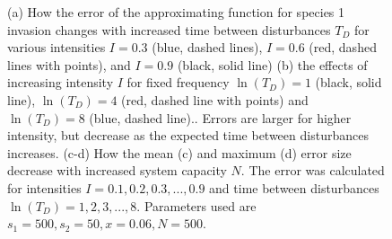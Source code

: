 \begin{figure}[th]
   \caption[Approximation errors for species 1 invasion]{(a) How the error of the approximating function for species 1 invasion changes with increased time between disturbances $T_D$ for various intensities $I=0.3$ (blue, dashed lines), $I=0.6$ (red, dashed lines with points), and $I=0.9$ (black, solid line) (b) the effects of increasing intensity $I$ for fixed frequency $\ln(T_D)=1$ (black, solid line), $\ln(T_D)=4$ (red, dashed line with points) and $\ln(T_D)=8$ (blue, dashed line).. Errors are larger for higher intensity, but decrease as the expected time between disturbances increases. (c-d) How the mean (c) and maximum (d) error size decrease with increased system capacity $N$. The error was calculated for intensities $I=0.1,0.2,0.3,...,0.9$ and time between disturbances $\ln(T_D)=1,2,3,...,8.$ Parameters used are $s_1=500,s_2=50,x=0.06,N=500$.}
 \label{fig:approxerror1}
\end{figure}
